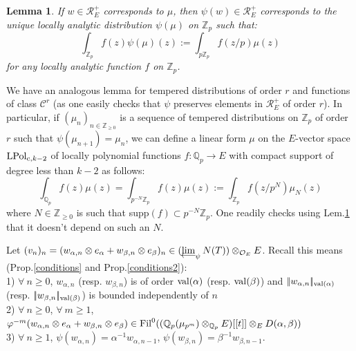 \documentclass[11pt]{amsart}
\def\limproj{\mathop{\oalign{{\rm lim}\cr 
\hidewidth$\longleftarrow$\hidewidth\cr}}}
\def\Z{{\mathbb Z}_p}
\def\Q{{\mathbb Q}_p}
\def\O{{\mathcal O}_E}
\newtheorem{lem}[definit]{\bf{Lemma}}
\begin{document}
\begin{lem}\label{Psidis} 
If $w\in {\mathcal R}_E^+$ corresponds to $\mu$, then $\psi(w)\in
{\mathcal R}_E^+$ corresponds to the unique locally analytic
distribution $\psi(\mu)$ on $\Z$ such that:  
$$\int_{\Z}f(z)\psi(\mu)(z):=\int_{p\Z}f(z/p)\mu(z)$$ 
for any locally analytic function $f$ on $\Z$. 
\end{lem} 
 
We have an analogous lemma for tempered distributions of order $r$ and
functions of class ${\mathcal C}^r$ (as one easily checks that $\psi$
preserves elements in ${\mathcal R}_E^+$ of order $r$). In particular,
if $(\mu_n)_{n\in{\mathbb Z}_{\geq 0}}$ is a sequence of tempered
distributions on $\Z$ of order $r$ such that $\psi(\mu_{n+1})=\mu_n$,
we can define a linear form $\mu$ on the $E$-vector space ${\rm
  LPol}_{{\rm c},k-2}$ of locally polynomial functions
$f:\Q\rightarrow E$ with compact support of degree less than $k-2$ as
follows:  
$$\int_{\Q}f(z)\mu(z)=\int_{p^{-N}\Z}f(z)\mu(z):=\int_{\Z}f(z/p^N)\mu_N(z)$$ 
where $N\in {\mathbb Z}_{\geq 0}$ is such that supp$(f)\subset
p^{-N}\Z$. 
One readily checks using Lem.\ref{Psidis} that it doesn't depend on
such an $N$. 
 
Let $(v_n)_n=(w_{\alpha,n}\otimes e_{\alpha}+w_{\beta,n}\otimes
e_{\beta})_n\in (\limproj_{\psi}N(T))\otimes_{\O}E$. Recall this means
(Prop.\ref{conditions} and Prop.\ref{conditions2}):\\  
1) $\forall\ n\geq 0$, $w_{\alpha,n}$ (resp. $w_{\beta,n}$) is of
order ${\rm val}(\alpha)$ (resp. ${\rm val}(\beta)$) and
$|\!|w_{\alpha,n}|\!|_{{\rm val}(\alpha)}$
(resp. $|\!|w_{\beta,n}|\!|_{{\rm val}(\beta)}$) is bounded
independently of $n$\\  
2) $\forall\ n\geq 0$, $\forall\ m\geq 1$,
$\varphi^{-m}(w_{\alpha,n}\otimes e_{\alpha}+w_{\beta,n}\otimes
e_{\beta})\in {\rm
  Fil}^0((\Q(\mu_{p^m})\otimes_{\Q}E)[[t]]\otimes_ED(\alpha,\beta))$\\  
3) $\forall\ n\geq 1$, $\psi(w_{\alpha,n})=\alpha^{-1}w_{\alpha,n-1}$,
$\psi(w_{\beta,n})=\beta^{-1}w_{\beta,n-1}$.  
 
\end{document}
